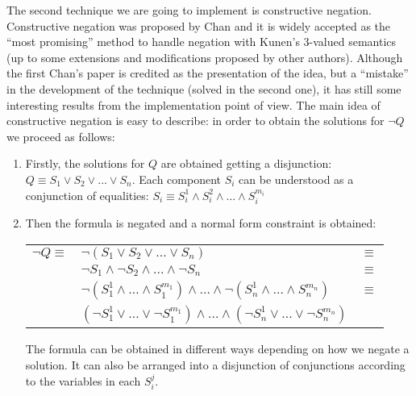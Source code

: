 \documentclass[]{llncs}
\begin{document}
The second technique we are going to implement is constructive
negation. Constructive negation was proposed by Chan
\cite{Chan1,Chan2} and it is widely accepted as the
``most promising'' method to handle negation with Kunen's 3-valued
semantics
(up to some extensions and modifications proposed by other authors).
Although the first Chan's paper is credited as the presentation
of the idea, but a ``mistake'' in the development of the technique
(solved in the second one), it has still some interesting results
from the implementation point of view. The main idea of constructive
negation is easy to describe: in order to obtain the solutions
for $\neg Q$ we proceed as follows:

\begin{enumerate}
\item Firstly, the solutions for $Q$ are obtained getting a
disjunction: $ Q \equiv S_1 \vee S_2 \vee ... \vee S_n $. Each
component $S_i$ can be understood as a conjunction of equalities: $
S_i \equiv S_i^1 \wedge S_i^2 \wedge \ldots \wedge S_i^{m_i} $

\item Then the formula is negated and a normal
form constraint is obtained:

\begin{center}
\begin{tabular}{lll}
$\neg Q \equiv$
  & $\neg (S_1 \vee S_2 \vee \ldots \vee S_n)$ & $\equiv$ \\
  & $\neg S_1 \wedge \neg S_2 \wedge \ldots \wedge \neg S_n$ & $\equiv$ \\
  & $\neg (S_1^1 \wedge \ldots \wedge S_1^{m_1}) \wedge \ldots \wedge
    \neg (S_n^1 \wedge \ldots \wedge S_n^{m_n})$ & $\equiv$ \\
  & $(\neg S_1^1 \vee \ldots \vee \neg S_1^{m_1}) \wedge \ldots \wedge
    (\neg S_n^1 \vee \ldots \vee \neg S_n^{m_n})$ & \\
\end{tabular}
\end{center}

The formula can be obtained in different ways depending on how
we negate a solution. It can also be arranged into a disjunction
of conjunctions according to the variables in each $S_i^j$.
\end{enumerate}
\end{document}
